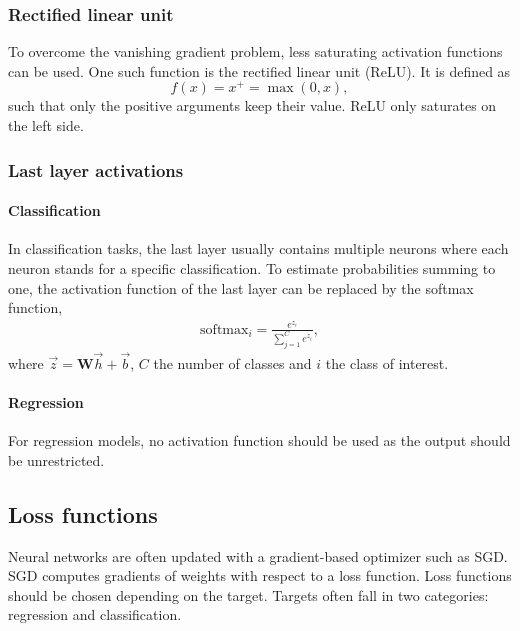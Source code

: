 \subsubsection{Rectified linear unit}\label{subsec:relu}
To overcome the vanishing gradient problem, less saturating activation functions can be used.
One such function is the rectified linear unit (ReLU).
It is defined as
\begin{equation}
    f(x) = x^+ = \max(0, x),
\end{equation}
such that only the positive arguments keep their value.
ReLU only saturates on the left side.

\subsubsection{Last layer activations}
\paragraph{Classification}
In classification tasks, the last layer usually contains multiple neurons where each neuron stands for a specific classification.
To estimate probabilities summing to one, the activation function of the last layer can be replaced by the softmax function,
\begin{align}
    \mathrm{softmax}_i = \frac{e^{z_i}}{\sum_{j=1}^C e^{z_i}},
\end{align}
where $\vec{z} = \mathbf{W}\vec{h}+\vec{b}$, $C$ the number of classes and $i$ the class of interest.

\paragraph{Regression}
For regression models, no activation function should be used as the output should be unrestricted.


\subsection{Loss functions}
Neural networks are often updated with a gradient-based optimizer such as SGD.
SGD computes gradients of weights with respect to a loss function.
Loss functions should be chosen depending on the target.
Targets often fall in two categories: regression and classification.

